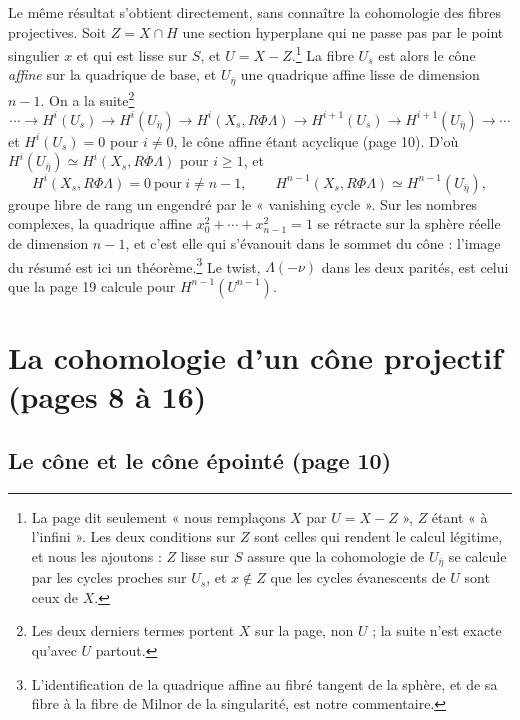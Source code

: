 \documentclass[11pt,a4paper]{article}
\begin{document}
Le même résultat s'obtient directement, sans connaître la cohomologie des
fibres projectives. Soit $Z = X \cap H$ une section hyperplane qui ne passe
pas par le point singulier $x$ et qui est lisse sur $S$, et
$U = X - Z$.\footnote{La page dit seulement « nous remplaçons $X$ par
$U = X - Z$ », $Z$ étant « à l'infini ». Les deux conditions sur
$Z$ sont celles qui rendent le calcul légitime, et nous les ajoutons : $Z$
lisse sur $S$ assure que la cohomologie de $U_{\bar\eta}$ se calcule par les
cycles proches sur $U_{s}$, et $x \notin Z$ que les cycles évanescents de
$U$ sont ceux de $X$.} La fibre $U_{s}$ est alors le cône \emph{affine} sur
la quadrique de base, et $U_{\bar\eta}$ une quadrique affine lisse de
dimension $n - 1$. On a la suite\footnote{Les deux derniers termes portent $X$ sur la page, non $U$ ; la
suite n'est exacte qu'avec $U$ partout.}
\[
  \cdots \to H^{i}(U_{s}) \to H^{i}(U_{\bar\eta}) \to H^{i}(X_{s}, R\Phi\Lambda)
  \to H^{i+1}(U_{s}) \to H^{i+1}(U_{\bar\eta}) \to \cdots
\]
et $H^{i}(U_{s}) = 0$ pour
$i \neq 0$, le cône affine étant acyclique (page 10). D'où
$H^{i}(U_{\bar\eta}) \simeq H^{i}(X_{s}, R\Phi\Lambda)$ pour $i \geq 1$, et
\[
  H^{i}(X_{s}, R\Phi\Lambda) = 0 \ \text{pour}\ i \neq n - 1, \qquad
  H^{n-1}(X_{s}, R\Phi\Lambda) \simeq H^{n-1}(U_{\bar\eta}),
\]
groupe libre de rang un engendré par le « vanishing cycle ». Sur les
nombres complexes, la quadrique affine
$x_{0}^{2} + \cdots + x_{n-1}^{2} = 1$ se rétracte sur la sphère réelle de
dimension $n - 1$, et c'est elle qui s'évanouit dans le sommet du cône :
l'image du résumé est ici un théorème.\footnote{L'identification de la
quadrique affine au fibré tangent de la sphère, et de sa fibre à la fibre
de Milnor de la singularité, est notre commentaire.} Le twist,
$\Lambda(-\nu)$ dans les deux parités, est celui que la page 19 calcule
pour $H^{n-1}(U^{n-1})$.

\section*{La cohomologie d'un cône projectif (pages 8 à 16)}

\subsection*{Le cône et le cône épointé (page 10)}
\end{document}
